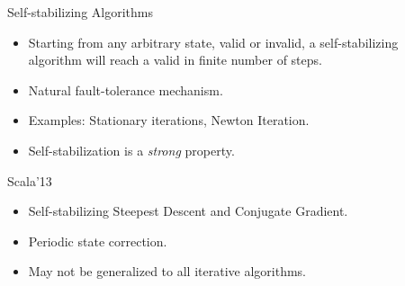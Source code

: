 \lyxframeend{}

\begin{columns}
\begin{column}{0.5\textwidth}

\end{column}
\begin{column}{0.5\textwidth}
\begin{block}{Self-stabilizing Algorithms}
\begin{itemize}
\item Starting from any arbitrary state, valid or invalid, a self-stabilizing algorithm will reach a valid in finite number of steps. 
\item Natural fault-tolerance mechanism.
\item Examples: Stationary iterations, Newton Iteration. 
\item Self-stabilization is a \emph{strong} property.
\end{itemize}
\end{block}

\begin{block}{Scala'13}
\begin{itemize}
\item Self-stabilizing Steepest Descent and Conjugate Gradient.
\item Periodic state correction.
\item May not be generalized to all iterative algorithms.
\end{itemize}
\end{block}
\end{column}
\end{columns}


